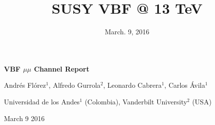 \documentclass{beamer}
\title{ SUSY VBF @ 13 TeV}
\author{}
\institute[Uniandes, Vandy]{Uniandes, Vanderbilt}
\date{March. 9,  2016}
\begin{document}
\begin{frame}
 \centering
 {\bfseries VBF $\mu \mu$ Channel Report} \\
  
  \vspace{2.0cm}
  
  Andr\'es Fl\'orez$^{1}$, Alfredo Gurrola$^{2}$, Leonardo Cabrera$^{1}$, Carlos \'Avila$^{1}$ \\
  
  \vspace{0.5cm}
  
Universidad de los Andes$^{1}$ (Colombia), Vanderbilt University$^{2}$ (USA)
  
  \vspace{2.0cm}

March 9 2016

\end{frame}

\end{document}
